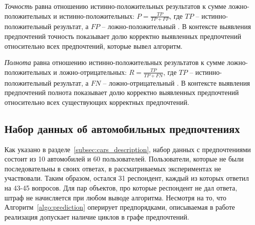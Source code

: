 	\begin{definition}
		\label{def:precision}
		\emph{Точность} равна отношению истинно-положительных результатов к сумме ложно-положительных и истинно-положительных: $P = \frac{TP}{TP + FP}$, где $TP$ – истинно-положительный результат, а $FP$ – ложно-положительный \cite[с.~155]{Manning:2008}. В контексте выявления предпочтений точность показывает долю корректно выявленных предпочтений относительно всех предпочтений, которые вывел алгоритм.
	\end{definition}
	
	\begin{definition}
		\label{def:recall}
		\emph{Полнота} равна отношению истинно-положительных результатов к сумме ложно-положительных и ложно-отрицательных: $R = \frac{TP}{TP + FN}$, где $TP$ – истинно-положительный результат, а $FN$ – ложно-отрицательный \cite[с.~155]{Manning:2008}. В контексте выявления предпочтений полнота показывает долю корректно выявленных предпочтений относительно всех существующих корректных предпочтений.
	\end{definition}
	
	\subsection{Набор данных об автомобильных предпочтениях}
	\label{subsec:exp_cars}
		Как указано в разделе~\ref{subsec:cars_description}, набор данных с предпочтениями состоит из 10 автомобилей и 60 пользователей. Пользователи, которые не были последовательны в своих ответах, в рассматриваемых экспериментах не участвовали. Таким образом, остался 31 респондент, каждый из которых ответил на 43-45 вопросов. Для пар объектов, про которые респондент не дал ответа, штраф не начисляется при любом выводе алгоритма. Несмотря на то, что Алгоритм~\ref{algo:prediction} оперирует предпорядками, описываемая в работе реализация допускает наличие циклов в графе предпочтений.
	
